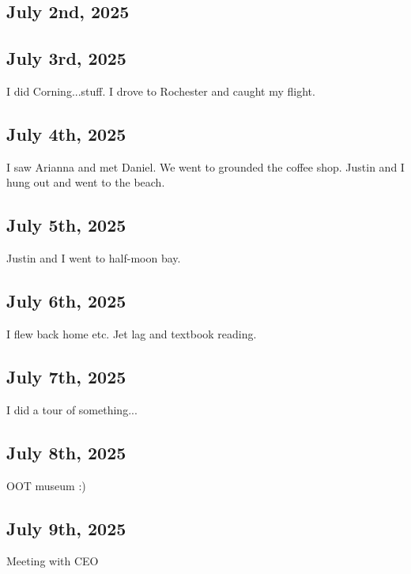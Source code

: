 \documentclass{article}
\begin{document}
\subsection{July 2nd, 2025}


\subsection{July 3rd, 2025}
I did Corning...stuff. I drove to Rochester and caught my flight. 



\subsection{July 4th, 2025}
I saw Arianna and met Daniel. We went to grounded the coffee shop. Justin and I hung out and went to the beach. 


\subsection{July 5th, 2025}
Justin and I went to half-moon bay. 

\subsection{July 6th, 2025}
I flew back home etc. Jet lag and textbook reading. 

\subsection{July 7th, 2025}
I did a tour of something...

\subsection{July 8th, 2025}
OOT museum :) 

\subsection{July 9th, 2025}
Meeting with CEO








\end{document}
